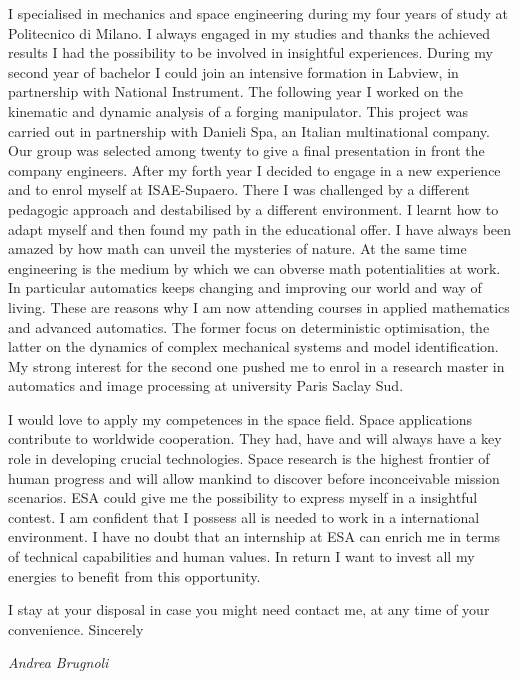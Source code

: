\documentclass[11pt]{letter}
\begin{document}
 I specialised in mechanics and space engineering during my four years of study at Politecnico di Milano. I always engaged in my studies and thanks the achieved results I had the possibility to be involved in insightful experiences. During my second year of bachelor I could join an intensive formation in Labview, in partnership with National Instrument. The following year I worked on the kinematic and dynamic analysis of a forging manipulator. This project was carried out in partnership with Danieli Spa, an Italian multinational company. Our group was selected among twenty to give a final presentation in front the company engineers. 
 After my forth year I decided to engage in a new experience and to enrol myself at ISAE-Supaero. There I was challenged by a different pedagogic approach and destabilised by a different environment.  I learnt how to adapt myself and then found my path in the educational offer. I have always been amazed by how math can unveil the mysteries of nature. At the same time engineering is the medium by which we can obverse math potentialities at work. In particular automatics keeps changing and improving our world  and way of living. These are reasons why I am now attending courses in applied mathematics  and advanced automatics. The former focus on deterministic optimisation, the latter on the dynamics of complex mechanical systems and model identification. My strong interest for the second one pushed me to enrol in a research master in automatics and image processing at university Paris Saclay Sud.

I would love to apply my competences in the space field. Space applications contribute to worldwide cooperation.  They had, have and will always have a key role in developing crucial technologies. Space research is the highest frontier of human progress and will allow mankind to discover before inconceivable mission scenarios. ESA could give me the possibility to express myself in a insightful contest. I am confident that I possess all is needed to work in a international environment.  I have no doubt that an internship at ESA can enrich me in terms of technical capabilities and human values. In return I want to invest all my energies to benefit from this opportunity.

I stay at your disposal in case you might need contact me, at any time of your convenience.
Sincerely
 \begin{center}
 \large\textit{Andrea Brugnoli}
 \end{center}
 
\end{document}

